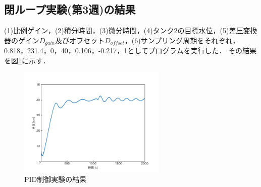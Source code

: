 \documentclass[12pt]{jsarticle}
\begin{document}
\subsection{閉ループ実験(第3週)の結果}
(1)比例ゲイン，(2)積分時間，(3)微分時間，(4)タンク2の目標水位，(5)差圧変換器のゲイン$D_{gain}$及びオフセット$D_{offset}$，(6)サンプリング周期をそれぞれ，0.818，231.4，0，40，0.106，-0.217，1としてプログラムを実行した．
その結果を図\ref{PIDExp}に示す．
\begin{figure}[htb]
  \begin{center}
    \includegraphics[clip, width=7.0cm]{../graph/PID_controll.png}
    \caption{PID制御実験の結果}
    \label{PIDExp}
  \end{center}
\end{figure}
\end{document}
